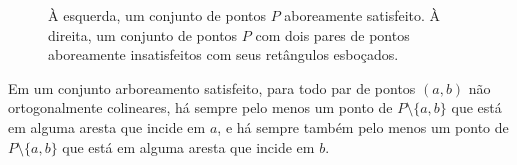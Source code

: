 \begin{figure}[h!]
    \centering
    \begin{minipage}[b]{0.45\textwidth}
        \centering
    \end{minipage}\hfill
    \begin{minipage}[b]{0.45\textwidth}
        \centering
    \end{minipage}
    \caption{À esquerda, um conjunto de pontos $P$ aboreamente satisfeito. À direita, um conjunto de pontos $P$ com dois pares de pontos aboreamente insatisfeitos com seus retângulos esboçados.}
\label{fig:geometria-inicial}
\end{figure}

\begin{lemma}
\label{lem:pontos_em_arestas_incidentes}
Em um conjunto arboreamento satisfeito, para todo par de pontos $(a,b)$ não ortogonalmente colineares, há sempre pelo menos um ponto de \( P \setminus \{a,b\} \) que está em alguma aresta que incide em $a$, e há sempre também pelo menos um ponto de \( P \setminus \{a,b\} \) que está em alguma aresta que incide em $b$.
\end{lemma}


